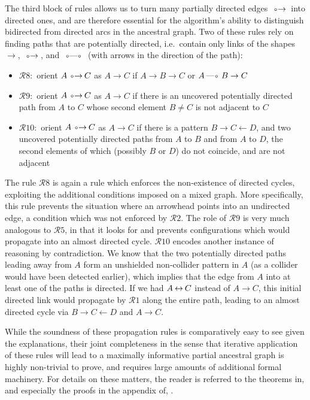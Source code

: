 The third block of rules allows us to turn many partially directed edges $\arrowOA$ into
directed ones, and are therefore essential for the algorithm's ability to distinguish
bidirected from directed arcs in the ancestral graph. Two of these rules rely on finding
paths that are potentially directed, i.e.\ contain only links of the shapes
$\rightarrow$, $\arrowOA$, and $\arrowOO$ (with arrows in the direction of the path):
\begin{itemize}
 \item $\mathcal{R}8:$ orient $A \arrowOA C$ as $A \rightarrow C$ if $A \rightarrow B \rightarrow C$
 or $A \arrowLO B \rightarrow C$
 \item $\mathcal{R}9:$ orient $A \arrowOA C$ as $A \rightarrow C$ if there is an
 uncovered potentially directed path from $A$ to $C$ whose second element $B \neq C$ is not adjacent to $C$
 \item $\mathcal{R}10:$ orient $A \arrowOA C$ as $A \rightarrow C$ if there is a pattern $B \rightarrow C \leftarrow D$,
 and two uncovered potentially directed paths from $A$ to $B$ and from $A$ to $D$, the second elements of which
 (possibly $B$ or $D$) do not coincide, and are not adjacent
\end{itemize}
The rule $\mathcal{R}8$ is again a rule which enforces the non-existence of directed cycles, exploiting the additional conditions imposed on a mixed graph. More specifically, this rule prevents the situation where an arrowhead points into an undirected edge, a condition which was not enforced by $\mathcal{R}2$. The role of $\mathcal{R}9$ is very much analogous to $\mathcal{R}5$, in that it looks for and prevents configurations which would propagate into an almost directed cycle. $\mathcal{R}10$ encodes another instance of reasoning by contradiction. We know that the two potentially directed paths leading away from $A$ form an unshielded non-collider pattern in $A$ (as a collider would have been detected earlier), which implies that the edge from $A$ into at least one of the paths is directed. If we had $A \arrowAA C$ instead of $A \rightarrow C$, this initial directed link would propagate by $\mathcal{R}1$ along the entire path, leading to an almost directed cycle via $B \rightarrow C \leftarrow D$ and $A \rightarrow C$.

While the soundness of these propagation rules is comparatively easy to see given the explanations, their joint completeness in the sense that iterative application of these rules will lead to a maximally informative partial ancestral graph is highly non-trivial to prove, and requires large amounts of additional formal machinery. For details on these matters, the reader is referred to the theorems in, and especially the proofs in the appendix of, \cite{zhang2008}.

